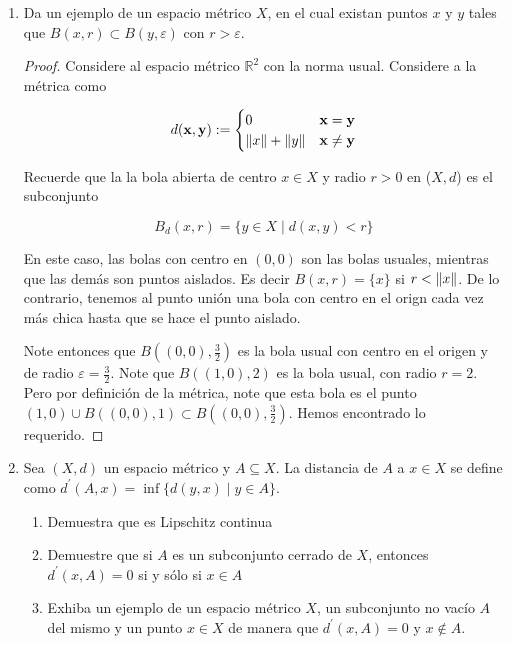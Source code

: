 \documentclass[12pt]{article}
\newcommand\R{\ensuremath{\mathbb{R}}}
\begin{document}
\begin{enumerate}[label=\textbf{\arabic*}.]

\item Da un ejemplo de un espacio métrico $X$, en el cual existan puntos $x$ y $y$ tales que $B(x, r) \subset B(y,\varepsilon)$ con $r > \varepsilon$.

\begin{proof}
    Considere al espacio métrico $\R^2$ con la norma usual. Considere a la métrica como 
    
    $$d (\mathbf{x},\mathbf{y}) := \begin{cases}
0 & \mathbf{x} = \mathbf{y}\\
 \norm{x}+\norm{y} & \mathbf{x}\neq \mathbf{y}
\end{cases}$$

Recuerde que la la bola abierta de centro $x \in X$ y radio $r > 0$ en ($X,d$) es el subconjunto

        $$
            B_d(x,r) = \{ y \in X \mid d(x,y) < r \}
        $$

        En este caso, las bolas con centro en $(0,0)$ son las bolas usuales, mientras que las demás son puntos aislados. Es decir $B(x,r) = \{ x\}$ si $r < \norm{x}$. De lo contrario, tenemos al punto unión una bola con centro en el orign cada vez más chica hasta que se hace el punto aislado. 

        Note entonces que $B((0,0), \frac{3}{2})$ es la bola usual con centro en el origen y de radio $ \varepsilon = \frac{3}{2}$. Note que $B((1,0), 2)$ es la bola usual, con radio $r = 2$. Pero por definición de la métrica, note que esta bola es el punto $(1,0) \cup B((0,0),1) \subset B((0,0), \frac{3}{2})$. Hemos encontrado lo requerido. 
\end{proof}

\item Sea $(X, d)$ un espacio métrico y $A \subseteq X$. La distancia de $A$ a $x \in X $ se define como ${d}^{\prime}(A,x) = \inf \{ d(y,x) \mid y \in A \}$.

\begin{enumerate}
    \item Demuestra que es Lipschitz continua
    \item Demuestre que si $A$ es un subconjunto cerrado de $X$, entonces $d^\prime(x, A) = 0$ si y sólo si $x \in A$
    \item Exhiba un ejemplo de un espacio métrico $X$, un subconjunto no vacío $A$ del mismo y un punto $x \in X$ de manera que $d^\prime
    (x, A)=0$ y $x \notin A.$
\end{enumerate}


\end{enumerate}
\end{document}
